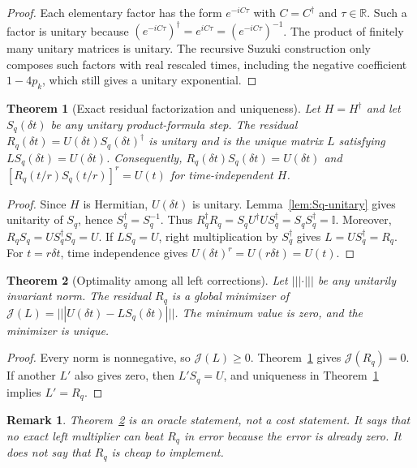 \documentclass[aps,prresearch,reprint,superscriptaddress,nofootinbib,amsmath,amssymb]{revtex4-2}
\newcommand{\id}{\mathbb{I}}
\newcommand{\dt}{\delta t}
\newtheorem{theorem}{Theorem}
\newtheorem{remark}{Remark}
\begin{document}
\begin{proof}
Each elementary factor has the form $e^{-iC\tau}$ with $C=C^\dagger$ and $\tau\in\mathbb{R}$. Such a factor is unitary because $(e^{-iC\tau})^\dagger=e^{iC\tau}=(e^{-iC\tau})^{-1}$. The product of finitely many unitary matrices is unitary. The recursive Suzuki construction only composes such factors with real rescaled times, including the negative coefficient $1-4p_k$, which still gives a unitary exponential.
\end{proof}

\begin{theorem}[Exact residual factorization and uniqueness]
\label{thm:factorization}
Let $H=H^\dagger$ and let $S_q(\dt)$ be any unitary product-formula step. The residual $R_q(\dt)=U(\dt)S_q(\dt)^\dagger$ is unitary and is the unique matrix $L$ satisfying $LS_q(\dt)=U(\dt)$. Consequently, $R_q(\dt)S_q(\dt)=U(\dt)$ and $[R_q(t/r)S_q(t/r)]^r=U(t)$ for time-independent $H$.
\end{theorem}

\begin{proof}
Since $H$ is Hermitian, $U(\dt)$ is unitary. Lemma~\ref{lem:Sq-unitary} gives unitarity of $S_q$, hence $S_q^\dagger=S_q^{-1}$. Thus $R_q^\dagger R_q=S_qU^\dagger US_q^\dagger=S_qS_q^\dagger=\id$. Moreover, $R_qS_q=U S_q^\dagger S_q=U$. If $L S_q=U$, right multiplication by $S_q^\dagger$ gives $L=US_q^\dagger=R_q$. For $t=r\dt$, time independence gives $U(\dt)^r=U(r\dt)=U(t)$.
\end{proof}

\begin{theorem}[Optimality among all left corrections]
\label{thm:optimality}
Let $|||\cdot|||$ be any unitarily invariant norm. The residual $R_q$ is a global minimizer of $\mathcal{J}(L)=|||U(\dt)-LS_q(\dt)|||$. The minimum value is zero, and the minimizer is unique.
\end{theorem}

\begin{proof}
Every norm is nonnegative, so $\mathcal{J}(L)\geq0$. Theorem~\ref{thm:factorization} gives $\mathcal{J}(R_q)=0$. If another $L'$ also gives zero, then $L'S_q=U$, and uniqueness in Theorem~\ref{thm:factorization} implies $L'=R_q$.
\end{proof}

\begin{remark}
Theorem~\ref{thm:optimality} is an oracle statement, not a cost statement. It says that no exact left multiplier can beat $R_q$ in error because the error is already zero. It does not say that $R_q$ is cheap to implement.
\end{remark}
\end{document}
